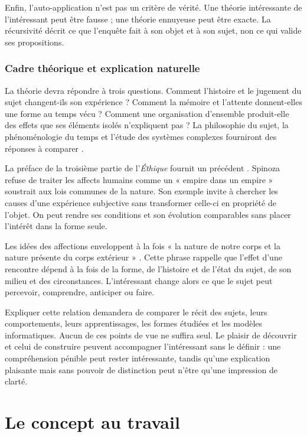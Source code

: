 \documentclass[11pt,a4paper]{article}
\begin{document}
Enfin, l'auto-application n'est pas un critère de vérité. Une théorie
intéressante de l'intéressant peut être fausse ; une théorie ennuyeuse peut être
exacte. La récursivité décrit ce que l'enquête fait à son objet et à son sujet,
non ce qui valide ses propositions.

\section{Cadre théorique et explication naturelle}

La théorie devra répondre à trois questions. Comment l'histoire et le jugement
du sujet changent-ils son expérience ? Comment la mémoire et l'attente donnent-elles
une forme au temps vécu ? Comment une organisation d'ensemble produit-elle des
effets que ses éléments isolés n'expliquent pas ? La philosophie du sujet, la
phénoménologie du temps et l'étude des systèmes complexes fourniront des réponses
à comparer
\parencite{petitot1993phenomenologie,petitot2002naturaliser}.

La préface de la troisième partie de l'\emph{Éthique} fournit un précédent
\parencite{spinoza1966ethique}. Spinoza refuse de
traiter les affects humains comme un « empire dans un empire » soustrait aux
lois communes de la nature. Son exemple invite à chercher les causes d'une
expérience subjective sans transformer celle-ci en propriété de l'objet. On
peut rendre ses conditions et son évolution comparables sans placer l'intérêt
dans la forme seule.

Les idées des affections enveloppent à la fois « la nature de notre corps et la
nature présente du corps extérieur »
\parencite[III, prop. XXVII, dém.]{spinoza1861oeuvres}. Cette phrase rappelle que
l'effet d'une rencontre dépend à la fois de la forme, de l'histoire et de l'état
du sujet, de son milieu et des circonstances. L'intéressant change alors ce que
le sujet peut percevoir, comprendre, anticiper ou faire.

Expliquer cette relation demandera de comparer le récit des sujets, leurs
comportements, leurs apprentissages, les formes étudiées et les modèles
informatiques. Aucun de ces points de vue ne suffira seul. Le plaisir
de découvrir et celui de construire
\parencite{feynman1999pleasure,florman1996existential} peuvent accompagner
l'intéressant sans le définir : une compréhension pénible peut rester
intéressante, tandis qu'une explication plaisante mais sans pouvoir de
distinction peut n'être qu'une impression de clarté.

\part{Le concept au travail}
\end{document}

